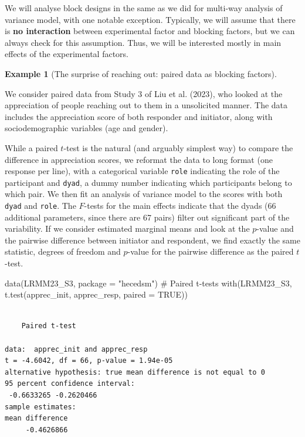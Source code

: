 \documentclass[
  11pt,
  letterpaper,
]{scrbook}
\newenvironment{Shaded}{\begin{snugshade}}{\end{snugshade}}
\newcommand{\AttributeTok}[1]{\textcolor[rgb]{0.40,0.45,0.13}{#1}}
\newcommand{\CommentTok}[1]{\textcolor[rgb]{0.37,0.37,0.37}{#1}}
\newcommand{\ConstantTok}[1]{\textcolor[rgb]{0.56,0.35,0.01}{#1}}
\newcommand{\FunctionTok}[1]{\textcolor[rgb]{0.28,0.35,0.67}{#1}}
\newcommand{\NormalTok}[1]{\textcolor[rgb]{0.00,0.23,0.31}{#1}}
\newcommand{\StringTok}[1]{\textcolor[rgb]{0.13,0.47,0.30}{#1}}
\theoremstyle{definition}
\theoremstyle{definition}
\newtheorem{example}{Example}[chapter]
\theoremstyle{remark}
\begin{document}
We will analyse block designs in the same as we did for multi-way
analysis of variance model, with one notable exception. Typically, we
will assume that there is \textbf{no interaction} between experimental
factor and blocking factors, but we can always check for this
assumption. Thus, we will be interested mostly in main effects of the
experimental factors.

\begin{example}[The surprise of reaching out: paired data as blocking
factors]\protect\hypertarget{exm-reachingout}{}\label{exm-reachingout}

We consider paired data from Study 3 of Liu et al. (2023), who looked at
the appreciation of people reaching out to them in a unsolicited manner.
The data includes the appreciation score of both responder and
initiator, along with sociodemographic variables (age and gender).

While a paired \(t\)-test is the natural (and arguably simplest way) to
compare the difference in appreciation scores, we reformat the data to
long format (one response per line), with a categorical variable
\texttt{role} indicating the role of the participant and \texttt{dyad},
a dummy number indicating which participants belong to which pair. We
then fit an analysis of variance model to the scores with both
\texttt{dyad} and \texttt{role}. The \(F\)-tests for the main effects
indicate that the dyads (66 additional parameters, since there are 67
pairs) filter out significant part of the variability. If we consider
estimated marginal means and look at the \(p\)-value and the pairwise
difference between initiator and respondent, we find exactly the same
statistic, degrees of freedom and \(p\)-value for the pairwise
difference as the paired \(t\)-test.

\begin{Shaded}
\begin{Highlighting}[]
\FunctionTok{data}\NormalTok{(LRMM23\_S3, }\AttributeTok{package =} \StringTok{"hecedsm"}\NormalTok{)}
\CommentTok{\# Paired t{-}tests}
\FunctionTok{with}\NormalTok{(LRMM23\_S3, }\FunctionTok{t.test}\NormalTok{(apprec\_init, apprec\_resp, }\AttributeTok{paired =} \ConstantTok{TRUE}\NormalTok{))}
\end{Highlighting}
\end{Shaded}

\begin{verbatim}

    Paired t-test

data:  apprec_init and apprec_resp
t = -4.6042, df = 66, p-value = 1.94e-05
alternative hypothesis: true mean difference is not equal to 0
95 percent confidence interval:
 -0.6633265 -0.2620466
sample estimates:
mean difference 
     -0.4626866 
\end{verbatim}


\end{example}
\end{document}
